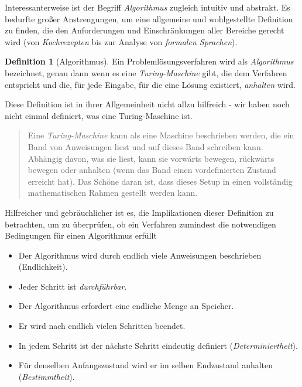 \documentclass[
]{book}
\providecommand{\tightlist}{%
  \setlength{\itemsep}{0pt}\setlength{\parskip}{0pt}}
\newenvironment {JHSAYS} [0] {\begin{quote}\color{jhsc}} {\end{quote}}
\theoremstyle{definition}
\newtheorem{definition}{Definition}[chapter]
\theoremstyle{definition}
\theoremstyle{definition}
\theoremstyle{definition}
\theoremstyle{remark}
\begin{document}
Interessanterweise ist der Begriff \emph{Algorithmus} zugleich intuitiv und abstrakt. Es bedurfte großer Anstrengungen, um eine allgemeine und wohlgestellte Definition zu finden, die den Anforderungen und Einschränkungen aller Bereiche gerecht wird (von \emph{Kochrezepten} bis zur Analyse von \emph{formalen Sprachen}).

\begin{definition}[Algorithmus]
\protect\hypertarget{def:algorithm}{}\label{def:algorithm}Ein Problemlösungsverfahren wird als \emph{Algorithmus} bezeichnet, genau dann wenn es eine \emph{Turing-Maschine} gibt, die dem Verfahren entspricht und die, für jede Eingabe, für die eine Lösung existiert, \emph{anhalten} wird.
\end{definition}

Diese Definition ist in ihrer Allgemeinheit nicht allzu hilfreich - wir haben noch nicht einmal definiert, was eine Turing-Maschine ist.

\leavevmode\hypertarget{rem-turing-machine}{}%
\begin{JHSAYS}
Eine \emph{Turing-Maschine} kann als eine Maschine beschrieben werden, die ein Band von Anweisungen liest und auf dieses Band schreiben kann. Abhängig davon, was sie liest, kann sie vorwärts bewegen, rückwärts bewegen oder anhalten (wenn das Band einen vordefinierten Zustand erreicht hat). Das Schöne daran ist, dass dieses Setup in einen vollständig mathematischen Rahmen gestellt werden kann.

\end{JHSAYS}

Hilfreicher und gebräuchlicher ist es, die Implikationen dieser Definition zu betrachten, um zu überprüfen, ob ein Verfahren zumindest die notwendigen Bedingungen für einen Algorithmus erfüllt

\begin{itemize}
\tightlist
\item
  Der Algorithmus wird durch endlich viele Anweisungen beschrieben (Endlichkeit).
\item
  Jeder Schritt ist \emph{durchführbar}.
\item
  Der Algorithmus erfordert eine endliche Menge an Speicher.
\item
  Er wird nach endlich vielen Schritten beendet.
\item
  In jedem Schritt ist der nächste Schritt eindeutig definiert (\emph{Determiniertheit}).
\item
  Für denselben Anfangszustand wird er im selben Endzustand anhalten (\emph{Bestimmtheit}).
\end{itemize}
\end{document}
